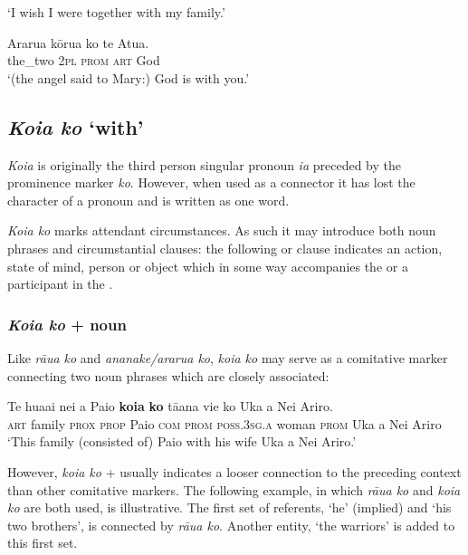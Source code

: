 \glt 
‘I wish I were together with my family.’ \textstyleExampleref{[R210.134]} 
\z

\ea\label{ex:8.200}
\gll Ararua kōrua ko te {\ꞌ}Atua. \\
the\_two \textsc{2pl} \textsc{prom} \textsc{art} God \\

\glt 
‘(the angel said to Mary:) God is with you.’ \textstyleExampleref{[R339.005]} 
\z
{}
\subsection{\textit{Koia ko} ‘with’}\label{sec:8.10.4}
\textit{Koia} is originally the third person singular pronoun \textit{ia} preceded by the prominence marker \textit{ko}. However, when used as a connector it has lost the character of a pronoun and is written as one word.

\textit{Koia ko} marks attendant circumstances. As such it may introduce both noun phrases and circumstantial clauses: the following  or clause indicates an action, state of mind, person or object which in some way accompanies the  or a participant in the . 

\subsubsection{\textit{Koia ko} + noun}\label{sec:8.10.4.1}
Like \textit{rāua ko} and \textit{ananake/ararua ko}, \textit{koia ko} may serve as a comitative marker connecting two noun phrases which are closely associated:

\ea\label{ex:8.201}
\gll Te hua{\ꞌ}ai nei a Paio \textbf{koia} \textbf{ko} tā{\ꞌ}ana vi{\ꞌ}e ko Uka {\ꞌ}a Nei Ariro. \\
\textsc{art} family \textsc{prox} \textsc{prop} Paio \textsc{com} \textsc{prom} \textsc{poss.3sg.a} woman \textsc{prom} Uka a Nei Ariro \\

\glt
‘This family (consisted of) Paio with his wife Uka a Nei Ariro.’ \textstyleExampleref{[R439.003]} 
\z

However, \textit{koia ko} +  usually indicates a looser connection to the preceding context than other comitative markers. The following example, in which \textit{rāua ko} and \textit{koia ko} are both used, is illustrative. The first set of referents, ‘he’ (implied) and ‘his two brothers’, is connected by \textit{rāua ko}. Another entity, ‘the warriors’ is added to this first set.

